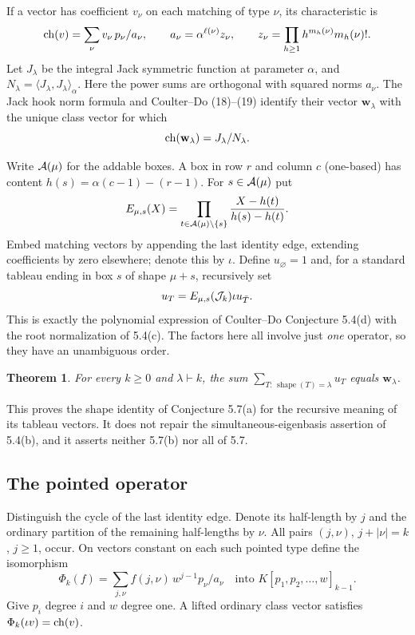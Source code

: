 \documentclass[11pt,a4paper]{article}
\newtheorem{SourceRceMtheorem}{Theorem}
\begin{document}
If a vector has coefficient $v_\nu$ on each matching of type $\nu$, its characteristic is
\[
 \operatorname{ch}(v)=\sum_\nu v_\nu\,p_\nu / a_\nu,
 \qquad a_\nu=\alpha^{\ell(\nu)}z_\nu,\qquad
 z_\nu=\prod_{h\ge1}h^{m_h(\nu)}m_h(\nu)! .
\]
Let $J_\lambda$ be the integral Jack symmetric function at parameter $\alpha$, and $N_\lambda=\langle J_\lambda,J_\lambda\rangle_\alpha$. Here the power sums are orthogonal with squared norms $a_\nu$. The Jack hook norm formula and Coulter--Do (18)--(19) identify their vector $\mathbf w_\lambda$ with the unique class vector for which
\begin{equation}
  \operatorname{ch}(\mathbf w_\lambda)=J_\lambda/N_\lambda .
  \label{R24M:jack}
\end{equation}

Write $\mathcal A(\mu)$ for the addable boxes. A box in row $r$ and column $c$ (one-based) has content $h(s)=\alpha(c-1)-(r-1)$. For $s\in\mathcal A(\mu)$ put
\[
 E_{\mu,s}(X)=
  \prod_{t\in\mathcal A(\mu)\setminus\{s\}}
   \frac{X-h(t)}{h(s)-h(t)} .
\]
Embed matching vectors by appending the last identity edge, extending coefficients by zero elsewhere; denote this by $\iota$. Define $u_\varnothing=1$ and, for a standard tableau ending in box $s$ of shape $\mu+s$, recursively set
\begin{equation}
  u_T= E_{\mu,s}(\mathcal J_k)\iota u_{\bar T}.
  \label{R24M:native}
\end{equation}
This is exactly the polynomial expression of Coulter--Do Conjecture 5.4(d) with the root normalization of 5.4(c). The factors here all involve just \emph{one} operator, so they have an unambiguous order.

\begin{SourceRceMtheorem}\label{R24M:main}
For every $k\ge0$ and $\lambda\vdash k$, the sum $\sum_{T:\,\operatorname{shape}(T)=\lambda}u_T$ equals $\mathbf w_\lambda$.
\end{SourceRceMtheorem}
This proves the shape identity of Conjecture 5.7(a) for the recursive meaning of its tableau vectors. It does not repair the simultaneous-eigenbasis assertion of 5.4(b), and it asserts neither 5.7(b) nor all of 5.7.

\subsection{The pointed operator}
Distinguish the cycle of the last identity edge. Denote its half-length by $j$ and the ordinary partition of the remaining half-lengths by $\nu$. All pairs $(j,\nu)$, $j+|\nu|=k$, $j\ge1$, occur. On vectors constant on each such pointed type define the isomorphism
\[
 \Phi_k(f)=\sum_{j,\nu} f(j,\nu)\, w^{j-1}p_\nu/a_\nu
 \quad\text{into }K[p_1,p_2,\ldots,w]_{k-1}.
\]
Give $p_i$ degree $i$ and $w$ degree one. A lifted ordinary class vector satisfies $\Phi_k(\iota v)=\operatorname{ch}(v)$.
\end{document}
